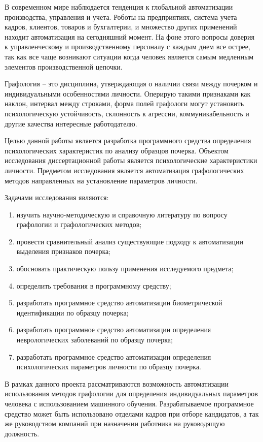 \label{sec:intro}

В современном мире наблюдается тенденция к глобальной автоматизации производства, управления и учета. Роботы на предприятиях, система учета кадров, клиентов, товаров и бухгалтерии, и множество других применений находит автоматизация на сегодняшний момент.
На фоне этого вопросы доверия к управленческому и производственному персоналу с каждым днем все острее, так как все чаще возникают ситуации когда человек является самым медленным элементов производственной цепочки.

Графология – это дисциплина, утверждающая о наличии связи между почерком и индивидуальными особенностями личности. Оперирую такими признаками как наклон, интервал между строками, форма полей графологи могут установить психологическую устойчивость, склонность к агрессии, коммуникабельность и другие качества интересные работодателю.

Целью данной работы является разработка программного средства определения психологических характеристик по анализу образцов почерка.
Объектом исследования диссертационной работы является психологические характеристики личности.
Предметом исследования является автоматизация графологических методов направленных на установление параметров личности.

Задачами исследования являются:
\begin{enumerate}
  \item изучить научно-методическую и справочную литературу по вопросу графологии и графологических методов;
  \item провести сравнительный анализ существующие подходу к автоматизации выделения признаков почерка;
  \item обосновать практическую пользу применения исследуемого \mbox{предмета};
  \item определить требования в программному средству;
  \item разработать программное средство автоматизации биометрической идентификации по образцу почерка;
  \item разработать программное средство автоматизации определения неврологических заболеваний по образцу почерка;
  \item разработать программное средство автоматизации определения психологических параметров личности по образцу почерка.
\end{enumerate}

В рамках данного проекта рассматриваются возможность автоматизации использования методов графологии для определения индивидуальных параметров человека с использованием машинного обучения.
Разрабатываемое программное средство может быть использовано отделами кадров при отборе кандидатов, а так же руководством компаний при назначении работника на руководящую должность.